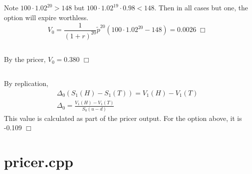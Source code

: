 \documentclass{article}
\begin{document}
\subsection{}
Note $100 \cdot 1.02^{20} > 148$ but $100 \cdot 1.02^{19} \cdot 0.98 < 148$. Then in all cases but one, the option will expire worthless.
$$V_0 = \frac{1}{(1+r)^{20}} \tilde{p}^{20} (100 \cdot 1.02^{20} - 148) = 0.0026 \; \Box$$

\subsection{}
By the pricer, $V_0 = 0.380$ $\Box$

\subsection{}
By replication,
\begin{gather*}
\Delta_0(S_1(H) - S_1(T)) = V_1(H) - V_1(T)\\
\Delta_0 = \frac{V_1(H) - V_1(T)}{S_0(u - d)}
\end{gather*}
This value is calculated as part of the pricer output. For the option above, it is -0.109 $\Box$

\section*{pricer.cpp}

\end{document}
